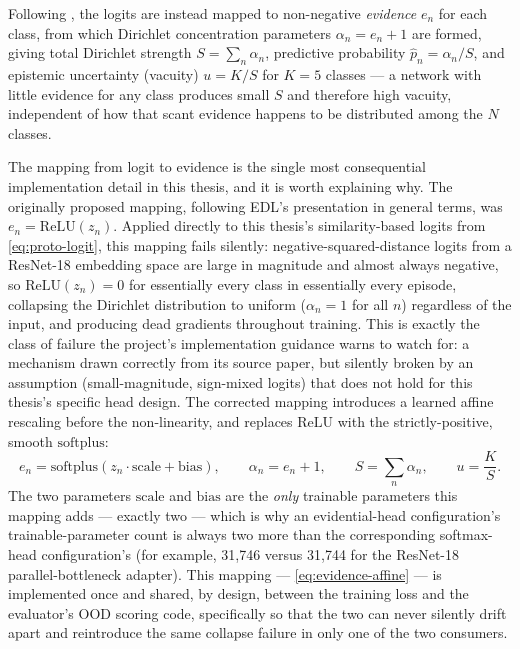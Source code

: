 \documentclass{iutbscthesis}
\begin{document}
Following \textcite{sensoy2018edl}, the logits are instead mapped to non-negative \emph{evidence} $e_n$ for each class, from which Dirichlet concentration parameters $\alpha_n = e_n + 1$ are formed, giving total Dirichlet strength $S = \sum_n \alpha_n$, predictive probability $\hat p_n = \alpha_n / S$, and epistemic uncertainty (vacuity) $u = K/S$ for $K = 5$ classes — a network with little evidence for any class produces small $S$ and therefore high vacuity, independent of how that scant evidence happens to be distributed among the $N$ classes.

The mapping from logit to evidence is the single most consequential implementation detail in this thesis, and it is worth explaining why. The originally proposed mapping, following EDL's presentation in general terms, was $e_n = \mathrm{ReLU}(z_n)$. Applied directly to this thesis's similarity-based logits from \autoref{eq:proto-logit}, this mapping fails silently: negative-squared-distance logits from a ResNet-18 embedding space are large in magnitude and almost always negative, so $\mathrm{ReLU}(z_n) = 0$ for essentially every class in essentially every episode, collapsing the Dirichlet distribution to uniform ($\alpha_n = 1$ for all $n$) regardless of the input, and producing dead gradients throughout training. This is exactly the class of failure the project's implementation guidance warns to watch for: a mechanism drawn correctly from its source paper, but silently broken by an assumption (small-magnitude, sign-mixed logits) that does not hold for this thesis's specific head design. The corrected mapping introduces a learned affine rescaling before the non-linearity, and replaces $\mathrm{ReLU}$ with the strictly-positive, smooth $\mathrm{softplus}$:
\begin{equation}
    e_n = \mathrm{softplus}\!\left( z_n \cdot \mathrm{scale} + \mathrm{bias} \right), \qquad \alpha_n = e_n + 1, \qquad S = \sum_{n} \alpha_n, \qquad u = \frac{K}{S}.
    \label{eq:evidence-affine}
\end{equation}
The two parameters $\mathrm{scale}$ and $\mathrm{bias}$ are the \emph{only} trainable parameters this mapping adds — exactly two — which is why an evidential-head configuration's trainable-parameter count is always two more than the corresponding softmax-head configuration's (for example, 31{,}746 versus 31{,}744 for the ResNet-18 parallel-bottleneck adapter). This mapping — \autoref{eq:evidence-affine} — is implemented once and shared, by design, between the training loss and the evaluator's OOD scoring code, specifically so that the two can never silently drift apart and reintroduce the same collapse failure in only one of the two consumers.
\end{document}
